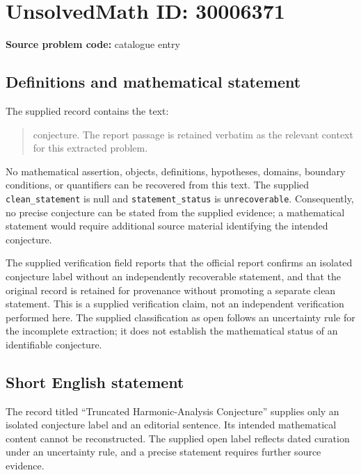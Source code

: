 \documentclass[11pt]{article}
\begin{document}
\section*{UnsolvedMath ID: 30006371}
\textbf{Source problem code:} catalogue entry
\subsection{Definitions and mathematical statement}
The supplied record contains the text: \begin{quote}conjecture. The report passage is retained verbatim as the relevant context for this extracted problem.\end{quote}
No mathematical assertion, objects, definitions, hypotheses, domains, boundary conditions, or quantifiers can be recovered from this text. The supplied \texttt{clean\_statement} is null and \texttt{statement\_status} is \texttt{unrecoverable}. Consequently, no precise conjecture can be stated from the supplied evidence; a mathematical statement would require additional source material identifying the intended conjecture.

The supplied verification field reports that the official report confirms an isolated conjecture label without an independently recoverable statement, and that the original record is retained for provenance without promoting a separate clean statement. This is a supplied verification claim, not an independent verification performed here. The supplied classification as open follows an uncertainty rule for the incomplete extraction; it does not establish the mathematical status of an identifiable conjecture.
\subsection{Short English statement}
The record titled ``Truncated Harmonic-Analysis Conjecture'' supplies only an isolated conjecture label and an editorial sentence. Its intended mathematical content cannot be reconstructed. The supplied open label reflects dated curation under an uncertainty rule, and a precise statement requires further source evidence.
\end{document}
